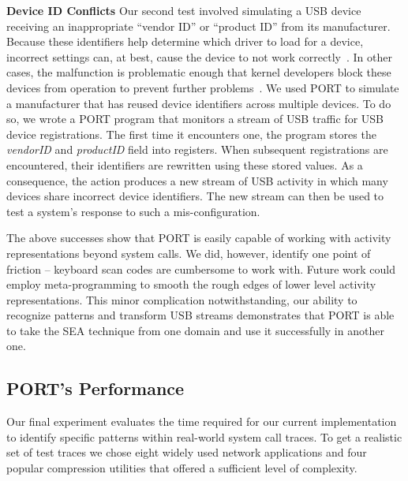 \textbf{Device ID Conflicts} Our second test involved simulating a USB device receiving an inappropriate ``vendor ID'' or ``product ID'' from its manufacturer.
Because these identifiers help determine which driver to load for a device,
incorrect settings can, at best, cause the device to not work correctly~\cite{wrongid}.
In other cases,
the malfunction is problematic enough that kernel developers block these devices from operation to prevent further problems~\cite{barscannerbug}.
We used PORT to simulate a manufacturer that has reused device identifiers across multiple devices.
To do so, we wrote a PORT program that monitors a stream of USB traffic for USB device registrations.
The first time it encounters one, the program stores the \textit{vendorID} and \textit{productID} field into registers.
When subsequent registrations are encountered,
their identifiers are rewritten using these stored values.
As a consequence, the action produces a new stream of USB activity in which many devices share incorrect device identifiers. The new stream can then be used to test a system's response to such a mis-configuration.

The above successes show that PORT is easily capable of working with activity representations beyond system calls.
We did, however, identify one point of friction -- keyboard scan codes are cumbersome to work with.
Future work could employ meta-programming to smooth the rough edges of lower level activity representations.
This minor complication notwithstanding,
our ability to recognize patterns and transform USB streams demonstrates
that PORT is able to take
the SEA technique from one domain and use it successfully in another one.


\subsection{PORT's Performance}

Our final experiment evaluates the
time required for our current implementation
to identify specific
patterns within real-world system call traces.
To get a realistic set of test traces
we chose
eight widely used network applications
and four popular compression utilities that
offered a sufficient level of complexity.

